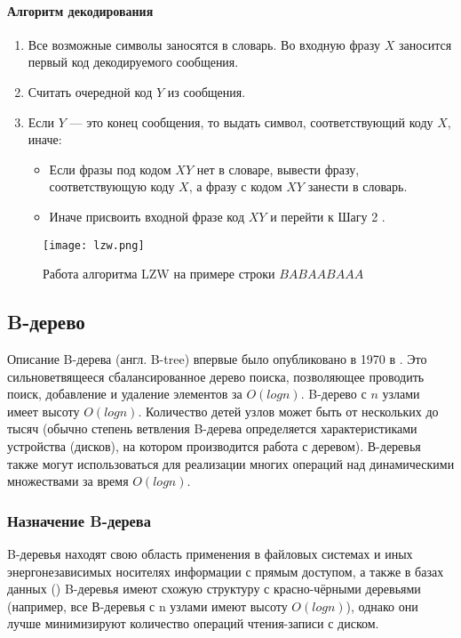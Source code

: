 \documentclass[14pt, russian]{scrartcl}
\begin{document}
\paragraph* {Алгоритм декодирования}

\begin{enumerate}
\item Все возможные символы заносятся в словарь. Во входную фразу $X$ заносится первый код декодируемого сообщения.
\item Считать очередной код $Y$ из сообщения.
\item Если $Y$ — это конец сообщения, то выдать символ, соответствующий коду $X$, иначе: 
    \begin{itemize}
    \item Если фразы под кодом $XY$ нет в словаре, вывести фразу, соответствующую коду $X$, а фразу с кодом $XY$ занести в словарь. 
    \item Иначе присвоить входной фразе код $XY$ и перейти к Шагу 2 .
    \end{itemize}
\end{enumerate}

\vspace{20pt}
\begin{figure}[!htb]\centering
\texttt{[image: lzw.png]}
\caption{Работа алгоритма LZW на примере строки $BABAABAAA$}
\label{fig::thesis}
\end{figure}

\subsection{B-дерево}
Описание B-дерева (англ. B-tree) впервые было опубликовано в 1970 в \cite{bayer1970}. Это сильноветвящееся сбалансированное дерево поиска, позволяющее проводить поиск, добавление и удаление элементов за $O(log n)$. B-дерево с $n$ узлами имеет высоту $O(log n)$. Количество детей узлов может быть от нескольких до тысяч (обычно степень ветвления B-дерева определяется характеристиками устройства (дисков), на котором производится работа с деревом). В-деревья также могут использоваться для реализации многих операций над динамическими множествами за время $O(log n)$.

\subsubsection{Назначение B-дерева}
B-деревья находят свою область применения в файловых системах и иных энергонезависимых носителях информации с прямым доступом, а также в базах данных (\cite{petrov}) B-деревья имеют схожую структуру с красно-чёрными деревьями (например, все В-деревья с n узлами имеют высоту $O(logn)$), однако они лучше минимизируют количество операций чтения-записи с диском. 
\end{document}
